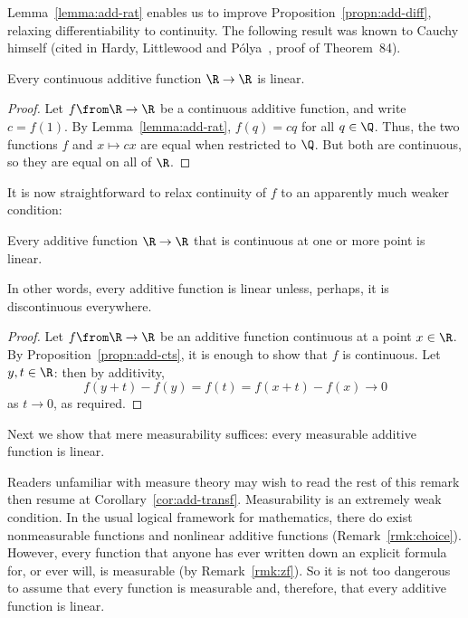 Lemma~\ref{lemma:add-rat} enables us to improve
Proposition~\ref{propn:add-diff}, relaxing differentiability to continuity.
The following result was known to Cauchy himself (cited in Hardy,
Littlewood and P\'olya~\cite{HLP}, proof of Theorem~84).

\begin{propn}
Every continuous additive function $\R \to \R$ is linear.
\end{propn}

\begin{proof}
Let $f \from \R \to \R$ be a continuous additive function, and write $c =
f(1)$.  By Lemma~\ref{lemma:add-rat}, $f(q) = cq$ for all $q \in \Q$. Thus,
the two functions $f$ and $x \mapsto cx$ are equal when restricted to $\Q$.
But both are continuous, so they are equal on all of $\R$.
\end{proof}

It is now straightforward to relax continuity of $f$ to an apparently much
weaker condition:

\begin{propn}
Every additive function $\R \to \R$ that is continuous at one or more point
is linear.
\end{propn}

In other words, every additive function is linear unless, perhaps, it is
discontinuous everywhere.

\begin{proof}
Let $f \from \R \to \R$ be an additive function continuous at a point $x
\in \R$.  By Proposition~\ref{propn:add-cts}, it is enough to show that $f$
is continuous.  Let $y, t \in \R$: then by additivity,
\[
f(y + t) - f(y)   
=
f(t)
=
f(x + t) - f(x)   
\to 0
\]
as $t \to 0$, as required.  
\end{proof}

Next we show that mere measurability suffices: every measurable additive
function is linear.

\begin{remark}
Readers unfamiliar with measure theory may wish to read the rest of this
remark then resume at Corollary~\ref{cor:add-transf}.
Measurability is an extremely weak condition.  In the
usual logical framework for mathematics, there do exist nonmeasurable
functions and nonlinear additive functions (Remark~\ref{rmk:choice}).
However, every function that anyone has ever written down an explicit
formula for, or ever will, is measurable (by Remark~\ref{rmk:zf}).  So it
is not too dangerous to assume that every function is measurable and,
therefore, that every additive function is linear.
\end{remark}

